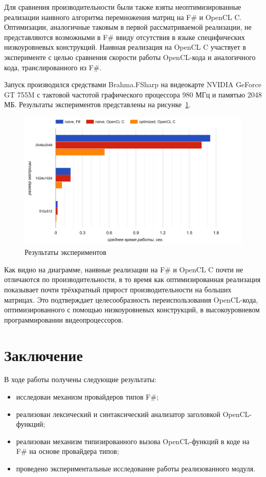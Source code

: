 Для сравнения производительности были также взяты неоптимизированные реализации наивного алгоритма перемножения матриц на F\# и OpenCL C. Оптимизации, аналогичные таковым в первой рассматриваемой реализации, не представляются возможными в F\# ввиду отсутствия в языке специфических низкоуровневых конструкций. Наивная реализация на OpenCL C участвует в эксперименте с целью сравнения скорости работы OpenCL-кода и аналогичного кода, транслированного из F\#.

Запуск производился средствами Brahma.FSharp на видеокарте NVIDIA GeForce GT 755M с тактовой частотой графического процессора 980 МГц и памятью 2048 МБ. Результаты экспериментов представлены на рисунке~\ref{experiments}.

\begin{figure}[h]
\centering
\includegraphics[width=\textwidth]{Smirenko/courseworkpictures/chart.png}
\caption{Результаты экспериментов}
\label{experiments}
\end{figure}

Как видно на диаграмме, наивные реализации на F\# и OpenCL C почти не отличаются по производительности, в то время как оптимизированная реализация показывает почти трёхкратный прирост производительности на больших матрицах. Это подтверждает целесообразность переиспользования OpenCL-кода, оптимизированного с помощью низкоуровневых конструкций, в высокоуровневом программировании видеопроцессоров.

\section*{Заключение}
В ходе работы получены следующие результаты:
\begin{itemize}
    \item исследован механизм провайдеров типов F\#;
    \item реализован лексический и синтаксический анализатор заголовкой OpenCL-функций;
    \item реализован механизм типизированного вызова OpenCL-функций в коде на F\# на основе провайдера типов;
    \item проведено экспериментальные исследование работы реализованного модуля.
\end{itemize}

